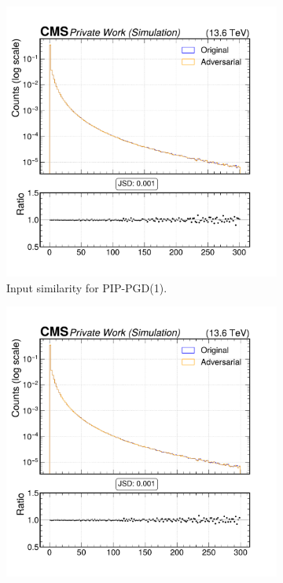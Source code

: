 \begin{figure}[h]
  \centering
  \begin{subfigure}[t]{0.32\textwidth}
    \includegraphics[width=\linewidth]{media/output/features/compare/combined_it_1/cmp_cpf_arr_Cpfcan_BtagPf_trackPPar.pdf}
    \caption*{Input similarity for PIP-PGD(1).}
  \end{subfigure}\hfill
  \begin{subfigure}[t]{0.32\textwidth}
    \includegraphics[width=\linewidth]{media/output/features/compare/combined_it_2/cmp_cpf_arr_Cpfcan_BtagPf_trackPPar.pdf}

\end{subfigure}
\end{figure}
